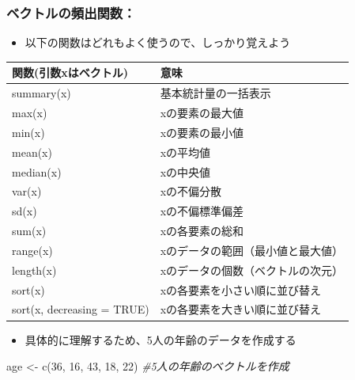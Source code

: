 \documentclass[
]{book}
\newenvironment{Shaded}{\begin{snugshade}}{\end{snugshade}}
\newcommand{\CommentTok}[1]{\textcolor[rgb]{0.56,0.35,0.01}{\textit{#1}}}
\newcommand{\DecValTok}[1]{\textcolor[rgb]{0.00,0.00,0.81}{#1}}
\newcommand{\FunctionTok}[1]{\textcolor[rgb]{0.00,0.00,0.00}{#1}}
\newcommand{\NormalTok}[1]{#1}
\newcommand{\OtherTok}[1]{\textcolor[rgb]{0.56,0.35,0.01}{#1}}
\providecommand{\tightlist}{%
  \setlength{\itemsep}{0pt}\setlength{\parskip}{0pt}}
\begin{document}
\hypertarget{ux30d9ux30afux30c8ux30ebux306eux983bux51faux95a2ux6570}{%
\subsubsection*{ベクトルの頻出関数：}\label{ux30d9ux30afux30c8ux30ebux306eux983bux51faux95a2ux6570}}

\begin{itemize}
\tightlist
\item
  以下の関数はどれもよく使うので、しっかり覚えよう
\end{itemize}

\begin{longtable}[]{@{}ll@{}}
\toprule()
関数(引数xはベクトル) & 意味 \\
\midrule()
\endhead
summary(x) & 基本統計量の一括表示 \\
max(x) & xの要素の最大値 \\
min(x) & xの要素の最小値 \\
mean(x) & xの平均値 \\
median(x) & xの中央値 \\
var(x) & xの不偏分散 \\
sd(x) & xの不偏標準偏差 \\
sum(x) & xの各要素の総和 \\
range(x) & xのデータの範囲（最小値と最大値） \\
length(x) & xのデータの個数（ベクトルの次元） \\
sort(x) & xの各要素を小さい順に並び替え \\
sort(x, decreasing = TRUE) & xの各要素を大きい順に並び替え \\
\bottomrule()
\end{longtable}

\begin{itemize}
\tightlist
\item
  具体的に理解するため、5人の年齢のデータを作成する
\end{itemize}

\begin{Shaded}
\begin{Highlighting}[]
\NormalTok{age }\OtherTok{\textless{}{-}} \FunctionTok{c}\NormalTok{(}\DecValTok{36}\NormalTok{, }\DecValTok{16}\NormalTok{, }\DecValTok{43}\NormalTok{, }\DecValTok{18}\NormalTok{, }\DecValTok{22}\NormalTok{) }\CommentTok{\#5人の年齢のベクトルを作成}
\end{Highlighting}
\end{Shaded}
\end{document}
